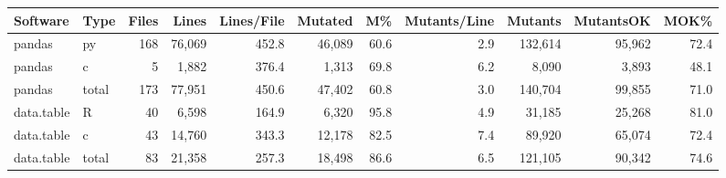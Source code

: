 \begin{tabular}{llrrrrrrrrr}
  \hline
Software & Type & Files & Lines & Lines/File & Mutated & M\% & Mutants/Line & Mutants & MutantsOK & MOK\% \\ 
  \hline
pandas & py & 168 & 76,069 & 452.8 & 46,089 & 60.6 & 2.9 & 132,614 & 95,962 & 72.4 \\ 
  pandas & c &  5 & 1,882 & 376.4 & 1,313 & 69.8 & 6.2 & 8,090 & 3,893 & 48.1 \\ 
  pandas & total & 173 & 77,951 & 450.6 & 47,402 & 60.8 & 3.0 & 140,704 & 99,855 & 71.0 \\ 
  data.table & R & 40 & 6,598 & 164.9 & 6,320 & 95.8 & 4.9 & 31,185 & 25,268 & 81.0 \\ 
  data.table & c & 43 & 14,760 & 343.3 & 12,178 & 82.5 & 7.4 & 89,920 & 65,074 & 72.4 \\ 
  data.table & total & 83 & 21,358 & 257.3 & 18,498 & 86.6 & 6.5 & 121,105 & 90,342 & 74.6 \\ 
   \hline
\end{tabular}
